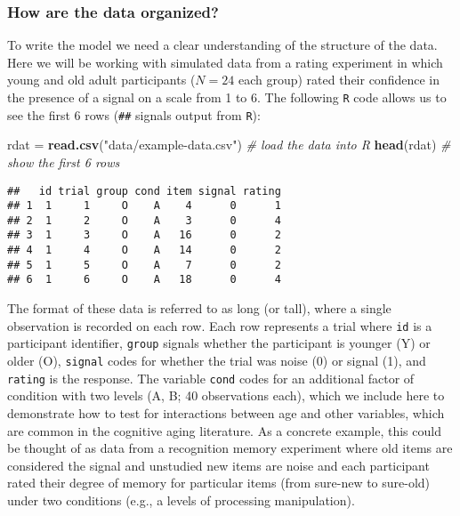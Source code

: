 \documentclass[
  english,
  ,man,floatsintext]{apa6}
\newenvironment{Shaded}{\begin{snugshade}}{\end{snugshade}}
\newcommand{\CommentTok}[1]{\textcolor[rgb]{0.56,0.35,0.01}{\textit{#1}}}
\newcommand{\KeywordTok}[1]{\textcolor[rgb]{0.13,0.29,0.53}{\textbf{#1}}}
\newcommand{\NormalTok}[1]{#1}
\newcommand{\StringTok}[1]{\textcolor[rgb]{0.31,0.60,0.02}{#1}}
\begin{document}
\hypertarget{how-are-the-data-organized}{%
\subsubsection{How are the data organized?}\label{how-are-the-data-organized}}

To write the model we need a clear understanding of the structure of the data. Here we will be working with simulated data from a rating experiment in which young and old adult participants (\(N=24\) each group) rated their confidence in the presence of a signal on a scale from 1 to 6. The following \texttt{R} code allows us to see the first 6 rows (\texttt{\#\#} signals output from \texttt{R}):

\begin{Shaded}
\begin{Highlighting}[]
\NormalTok{rdat =}\StringTok{ }\KeywordTok{read.csv}\NormalTok{(}\StringTok{"data/example-data.csv"}\NormalTok{) }\CommentTok{# load the data into R}
\KeywordTok{head}\NormalTok{(rdat) }\CommentTok{# show the first 6 rows}
\end{Highlighting}
\end{Shaded}

\begin{verbatim}
##   id trial group cond item signal rating
## 1  1     1     O    A    4      0      1
## 2  1     2     O    A    3      0      4
## 3  1     3     O    A   16      0      2
## 4  1     4     O    A   14      0      2
## 5  1     5     O    A    7      0      2
## 6  1     6     O    A   18      0      4
\end{verbatim}

The format of these data is referred to as long (or tall), where a single observation is recorded on each row. Each row represents a trial where \texttt{id} is a participant identifier, \texttt{group} signals whether the participant is younger (Y) or older (O), \texttt{signal} codes for whether the trial was noise (0) or signal (1), and \texttt{rating} is the response. The variable \texttt{cond} codes for an additional factor of condition with two levels (A, B; 40 observations each), which we include here to demonstrate how to test for interactions between age and other variables, which are common in the cognitive aging literature. As a concrete example, this could be thought of as data from a recognition memory experiment where old items are considered the signal and unstudied new items are noise and each participant rated their degree of memory for particular items (from sure-new to sure-old) under two conditions (e.g., a levels of processing manipulation).
\end{document}
